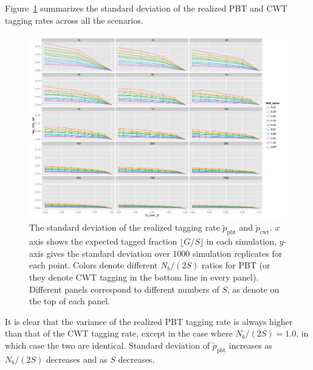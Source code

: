 \documentclass[11pt]{article}
\begin{document}
Figure~\ref{fig:all_sds} summarizes the standard deviation of the realized PBT and CWT tagging rates across all the scenarios.
\begin{figure}
\includegraphics[width = .93\textwidth]{./images/tag_rate_standard_devs.pdf}
\caption{The standard deviation of the realized tagging rate $\tilde{p}_\mathrm{pbt}$ and $\tilde{p}_\mathrm{cwt}$.  $x$ axis shows the
expected tagged fraction $\lfloor G/S \rfloor$ in each simulation, $y$-axis gives the standard deviation over 1000 simulation replicates
for each point.  Colors denote different $N_b/(2S)$ ratios for PBT (or they denote CWT tagging in the bottom line in every panel).  Different
panels correspond to different numbers of $S$, as denote on the top of each panel.
\label{fig:all_sds}}
\end{figure}
It is clear that the variance of the realized PBT tagging rate is always higher than that of the CWT tagging rate, except in the case where
$N_b/(2S) = 1.0$, in which case the two are identical.  Standard deviation of $\tilde{p}_\mathrm{pbt}$ increases as $N_b/(2S)$ decreases and
as $S$ decreases.  
\end{document}
